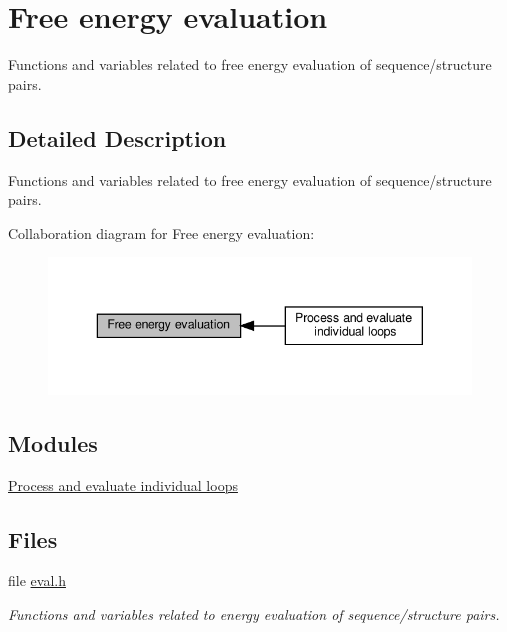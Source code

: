 \hypertarget{group__eval}{}\section{Free energy evaluation}
\label{group__eval}


Functions and variables related to free energy evaluation of sequence/structure pairs.  




\subsection{Detailed Description}
Functions and variables related to free energy evaluation of sequence/structure pairs. 

Collaboration diagram for Free energy evaluation\+:
\nopagebreak
\begin{figure}[H]
\begin{center}
\leavevmode
\includegraphics[width=343pt]{group__eval}
\end{center}
\end{figure}
\subsection*{Modules}
\begin{DoxyCompactItemize}
\item 
\hyperlink{group__loops}{Process and evaluate individual loops}
\end{DoxyCompactItemize}
\subsection*{Files}
\begin{DoxyCompactItemize}
\item 
file \hyperlink{eval_8h}{eval.\+h}
\begin{DoxyCompactList}\small\item\em Functions and variables related to energy evaluation of sequence/structure pairs. \end{DoxyCompactList}\end{DoxyCompactItemize}
